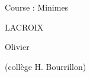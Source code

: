 \documentclass[a4paper,11pt,fleqn]{article}
\begin{document}
\begin{block}
\begin{minipage}{0.48\linewidth}
\vspace{0.5cm}

	Course : Minimes
\end{minipage}
\begin{minipage}{0.5\linewidth}
{}\hfill {}
{}\hfill {}

\bigskip

\begin{center}
	LACROIX
	
	Olivier
	
	(collège H. Bourrillon)
\end{center}
\end{minipage}


\end{block}

\vfill


\vfill
\end{document}
